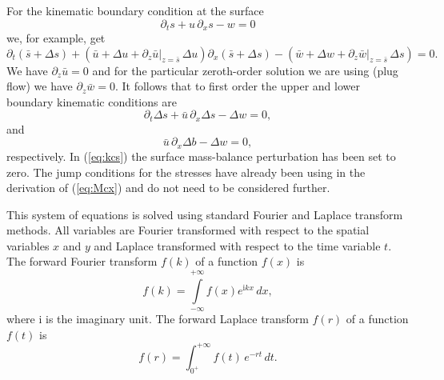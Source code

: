 \documentclass[10pt,a4paper]{book}
\newcommand{\p}{\partial}
\newcommand{\I}{\mathrm{i}}
\begin{document}
For the kinematic boundary condition at the surface
\[
\p_t s + u \, \p_x s -w =0
\]
we, for example, get
\[
\p_t (\bar{s}+\Delta s)+ (\bar{u}+\Delta u + \p_z \bar{u}|_{z=\bar{s}}\,
\Delta u) \p_x(\bar{s}+\Delta s)-(\bar{w} + \Delta w +\p_z \bar{w}|_{z=\bar{s}} \,\Delta s)=0.
\]
We have $\p_z \bar{u}=0$ and for the particular zeroth-order solution
we are using (plug flow) we have $\p_z \bar{w}=0$. It follows that
to first order the upper and lower boundary kinematic conditions are
\begin{equation}
\p_t \Delta s +\bar{u} \, \p_x \Delta s -\Delta w =0 ,\label{eq:kcs}
\end{equation}
and
\begin{equation}
\bar{u} \, \p_x \Delta b -\Delta w =0 ,\label{eq:kcb}
\end{equation}
respectively. In (\ref{eq:kcs}) the surface mass-balance perturbation
has been set to zero. The jump conditions for the stresses have
already been using in the derivation of (\ref{eq:Mcx}) and do not need
to be considered further.

This system of equations is solved using standard Fourier and Laplace
transform methods. All variables are Fourier transformed with respect
to the spatial variables $x$ and $y$ and Laplace transformed with
respect to the time variable $t$.  The forward Fourier transform
$f(k)$ of a function $f(x)$ is
\begin{equation} 
f(k) = \int\limits_{- \infty}^{+ \infty }
f(x) e^{\I k x  }\,dx  ,
\label{eq:Four} \end{equation}
where $\I$ is the imaginary unit. The forward Laplace transform $f(r)$ of a
function $f(t)$ is
\begin{equation} 
f(r)= \int_{0^{+}}^{+\infty} f(t)\, e^{-r t} \,dt .
\end{equation}
\end{document}
